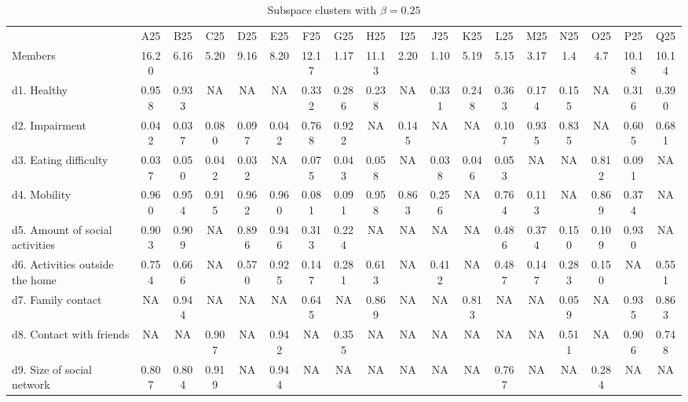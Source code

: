 \begin{table}
\renewcommand{\arraystretch}{0.95}
\centering\scriptsize
\setlength\tabcolsep{4pt} %
\caption{Subspace clusters with $\beta=0.25$\vspace*{-6pt}}
\label{tab:smallsubspace}%
\begin{tabulary}{\linewidth}{LCCCCCCCCCCCCCCCCC}
& A25   & B25   & C25   & D25   & E25   & F25   & G25   & H25   & I25   & J25   & K25   & L25   & M25   & N25   & O25   & P25   & Q25 \\
Members & 16.20 & 6.16  & 5.20  & 9.16  & 8.20  & 12.17 & 1.17  & 11.13 & 2.20  & 1.10  & 5.19  & 5.15  & 3.17  & 1.4   & 4.7   & 10.18 & 10.14 \\\toprule
d1. Healthy & 0.958 & 0.933 & NA    & NA    & NA    & 0.332 & 0.286 & 0.238 & NA    & 0.331 & 0.248 & 0.363 & 0.174 & 0.155 & NA    & 0.316 & 0.390 \\
d2. Impairment & 0.042 & 0.037 & 0.080 & 0.097 & 0.042 & 0.768 & 0.922 & NA    & 0.145 & NA    & NA    & 0.107 & 0.935 & 0.835 & NA    & 0.605 & 0.681 \\
d3. Eating difficulty & 0.037 & 0.050 & 0.042 & 0.032 & NA    & 0.075 & 0.043 & 0.058 & NA    & 0.038 & 0.046 & 0.053 & NA    & NA    & 0.812 & 0.091 & NA \\
d4. Mobility & 0.960 & 0.954 & 0.915 & 0.962 & 0.960 & 0.081 & 0.091 & 0.958 & 0.863 & 0.256 & NA    & 0.764 & 0.113 & NA    & 0.869 & 0.374 & NA \\
d5. Amount of social activities & 0.903 & 0.909 & NA    & 0.896 & 0.946 & 0.313 & 0.224 & NA    & NA    & NA    & NA    & 0.486 & 0.374 & 0.150 & 0.109 & 0.930 & NA \\
d6. Activities outside the home & 0.754 & 0.666 & NA    & 0.570 & 0.925 & 0.147 & 0.281 & 0.613 & NA    & 0.412 & NA    & 0.487 & 0.147 & 0.283 & 0.150 & NA    & 0.551 \\
d7. Family contact & NA    & 0.944 & NA    & NA    & NA    & 0.645 & NA    & 0.869 & NA    & NA    & 0.813 & NA    & NA    & 0.059 & NA    & 0.935 & 0.863 \\
d8. Contact with friends & NA    & NA    & 0.907 & NA    & 0.942 & NA    & 0.355 & NA    & NA    & NA    & NA    & NA    & NA    & 0.511 & NA    & 0.906 & 0.748 \\
d9. Size of social network & 0.807 & 0.804 & 0.919 & NA    & 0.944 & NA    & NA    & NA    & NA    & NA    & NA    & 0.767 & NA    & NA    & 0.284 & NA    & NA \\

\end{tabulary}
\end{table}
